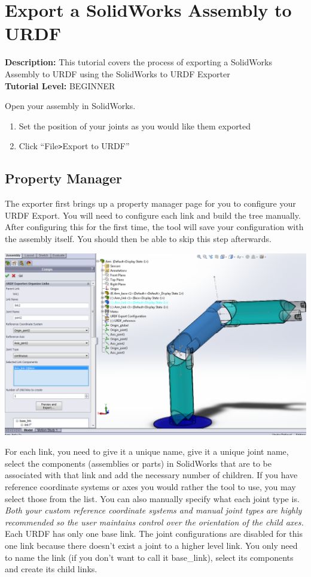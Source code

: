 \section{Export a SolidWorks Assembly to URDF}\label{sec:ExportSW}
\textbf{Description:} This tutorial covers the process of exporting a SolidWorks Assembly to URDF using the SolidWorks to URDF Exporter
\\

\noindent \textbf{Tutorial Level:} BEGINNER


\noindent Open your assembly in SolidWorks. 
\begin{enumerate}
\item Set the position of your joints as you would like them exported 
\item Click ``File\verb|>|Export to URDF'' 
\end{enumerate}

\subsection{Property Manager}
\indent The exporter first brings up a property manager page for you to configure your URDF Export. You will need to configure each link and build the tree manually. After configuring this for the first time, the tool will save your configuration with the assembly itself. You should then be able to skip this step afterwards. 

\includegraphics[width=\textwidth]{images/ExportPropertyManager}

For each link, you need to give it a unique name, give it a unique joint name, select the components (assemblies or parts) in SolidWorks that are to be associated with that link and add the necessary number of children. If you have reference coordinate systems or axes you would rather the tool to use, you may select those from the list. You can also manually specify what each joint type is. \emph{Both your custom reference coordinate systems and manual joint types are highly recommended so the user maintains control over the orientation of the child axes.} Each URDF has only one base link. The joint configurations are disabled for this one link because there doesn't exist a joint to a higher level link. You only need to name the link (if you don't want to call it base\_link), select its components and create its child links. 

